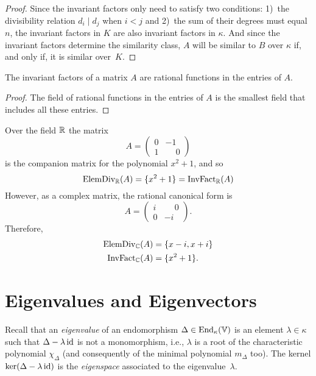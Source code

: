 \begin{proof}
    Since the invariant factors only need to satisfy two conditions: 1)~the divisibility relation $d_i \mid d_j$ when $i<j$ and 2)~the sum of their degrees must equal $n$, the invariant factors in $K$ are also invariant factors in $\kappa$. And since the invariant factors determine the similarity class, $A$ will be similar to $B$ over $\kappa$ if, and only if, it is similar over~$K$.
\end{proof}

\begin{cor}
    The invariant factors of a matrix $A$ are rational functions in the entries of $A$.
\end{cor}

\begin{proof}
    The field of rational functions in the entries of $A$ is the smallest field that includes all these entries.
\end{proof}

\begin{xmpl}
    Over the field $\mathbb{R}$ the matrix
    $$
        A = \begin{pmatrix}
            0 & -1 \\
            1 & \phantom-0
            \end{pmatrix}
    $$
    is the companion matrix for the polynomial $x^2+1$, and so
    $$
        \operatorname{ElemDiv}_{\mathbb{R}}(A) = \{x^2 + 1\} = 
            \operatorname{InvFact}_{\mathbb{R}}(A)
    $$
    However, as a complex matrix, the rational canonical form is
    $$
        A = \begin{pmatrix}
                i & \phantom-0 \\
                0 & -i
            \end{pmatrix}.
    $$
    Therefore,
    \begin{align*}
        \operatorname{ElemDiv}_{\mathbb{C}}(A) &= \{x-i, x+i\}\\ \operatorname{InvFact}_{\mathbb{C}}(A) &= \{x^2 + 1\}.
    \end{align*}
\end{xmpl}

\section{Eigenvalues and Eigenvectors}

Recall that an \textsl{eigenvalue} of an endomorphism $\Delta\in{\operatorname{End}}_\kappa(\mathbb V)$ is an element $\lambda\in\kappa$ such that $\Delta - \lambda\operatorname{id}$ is not a monomorphism, i.e., $\lambda$ is a root of the characteristic polynomial $\chi_\Delta$ (and consequently of the minimal polynomial $m_\Delta$ too). The kernel $\ker(\Delta-\lambda\operatorname{id})$ is the \textsl{eigenspace} associated to the eigenvalue~$\lambda$.

